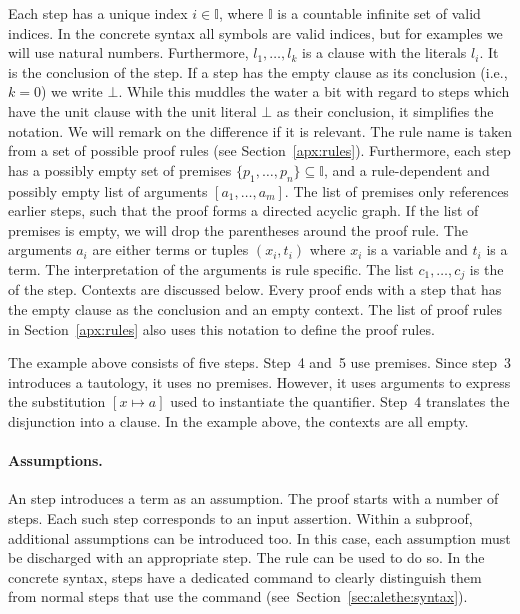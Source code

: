 \documentclass{scrartcl}
\begin{document}
\noindent
Each step has a unique index $i \in \mathbb{I}$, where $\mathbb{I}$ is a countable
infinite set of valid indices. In the concrete syntax all {\smtlib} symbols are
valid indices, but for examples we will use natural numbers.
%
Furthermore, $l_1, \dots ,l_k$ is a clause with the literals
$l_i$. It is the conclusion of the step. If a step has the empty clause
as its conclusion (i.e., $k = 0$) we write $\bot$.  While this
muddles the water a bit with regard to steps which have the unit clause
with the unit literal $\bot$ as their conclusion, it simplifies the
notation.  We will remark on the difference if it is relevant.  The rule
name  is taken from a set of possible proof
rules (see Section~\ref{apx:rules}).
Furthermore, each step has a possibly empty set of premises $\{p_1,
\dots, p_n\} \subseteq \mathbb{I}$,
and a rule-dependent and possibly
empty list of arguments $[a_1, \dots, a_m]$. The list of premises
only references earlier steps, such that the proof forms a directed
acyclic graph.  If the list of premises is empty, we will drop the
parentheses around the proof rule.
The arguments $a_i$ are either terms or tuples $(x_i,
t_i)$ where $x_i$ is a variable and $t_i$ is a term. The interpretation
of the arguments is rule specific.  The list $c_1, \dots, c_j$ is
the  of the step.  Contexts are discussed below.
Every proof ends with a step that has the empty clause as the conclusion
and an empty context.  The list of proof rules
in Section~\ref{apx:rules}
also uses
this notation to define the proof rules.

The example above consists of five steps. Step~4 and~5 use premises.
Since step~3 introduces a tautology, it uses no premises.  However,
it uses arguments to express the substitution $[x\mapsto a]$ used to instantiate
the quantifier. Step~4 translates the disjunction into a clause.
In the example above, the contexts are all empty.

\paragraph{Assumptions.}
An  step introduces a term as an
assumption. The proof starts with a number of
 steps. Each such step corresponds to an input
assertion. Within a subproof, additional assumptions can be introduced
too. In this case, each assumption must be discharged with an appropriate
step. The rule  can be used to do so.  In the concrete
syntax,  steps have a dedicated command 
to clearly distinguish them from normal steps that use the 
command (see~Section~\ref{sec:alethe:syntax}).
\end{document}
